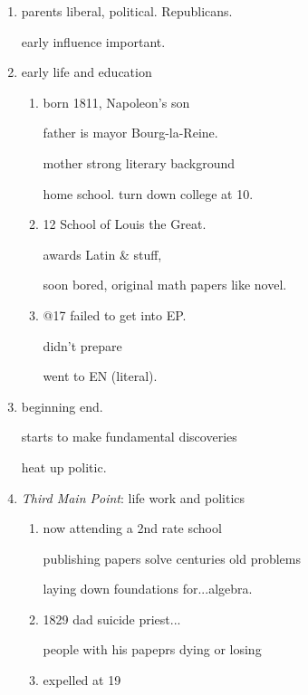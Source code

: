 \documentclass[letterpaper]{article}
\begin{document}
\begin{multicols}{2}
\begin{description}
\begin{enumerate}
\begin{enumerate}
    $\to$constitutional monarchy.

    king+2 houses, independant courts and press.
    \item
    1824 king dies, new king is brother.

    new king sucks. done by 1830.

    third king not bad, too late.
  \end{enumerate}
  \renewcommand{\labelenumi}{\emph{Transition}:}
  \item
  parents liberal, political. Republicans.

  early influence important.
  \renewcommand{\labelenumi}{\Roman{enumi}}
  \setcounter{enumi}{1}
  \item
  early life and education
  \begin{enumerate}
    \item
    born 1811, Napoleon's son

    father is  mayor Bourg-la-Reine.

    mother strong literary background
    
    home school. turn down college at 10.
    \item
    12 School of Louis the Great.

    awards Latin \& stuff,

    soon bored, original math papers like novel.
    \item
    @17 failed to get into EP.

    didn't prepare

    went to EN (literal).
  \end{enumerate}
  \renewcommand{\labelenumi}{\emph{Transition}:}
  \item
  beginning end.

  starts to make fundamental discoveries
  
  heat up politic.
  \renewcommand{\labelenumi}{\Roman{enumi}}
  \setcounter{enumi}{2}
  \item
  \emph{Third Main Point}: life work and politics
  \begin{enumerate}
    \item
    now attending a 2nd rate school
    
    publishing papers solve centuries old problems
    
    laying down foundations for...algebra.
    \item
    1829 dad suicide priest...
    
    people with his papeprs dying or losing
    \item
    expelled at 19
    

\end{enumerate}
\end{enumerate}
\end{description}
\end{multicols}
\end{document}
